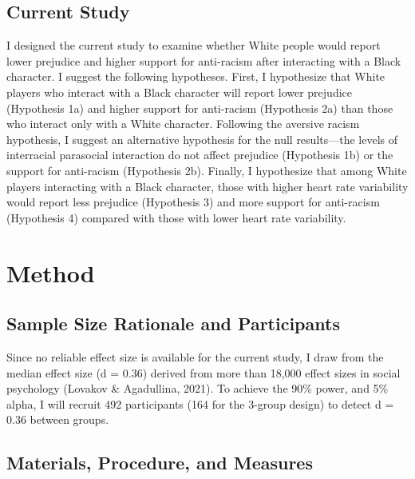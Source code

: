 \documentclass[
  english,
  man, noextraspace,floatsintext]{apa6}
\begin{document}
\hypertarget{current-study}{%
\subsection{Current Study}\label{current-study}}

I designed the current study to examine whether White people would report lower prejudice and higher support for anti-racism after interacting with a Black character. I suggest the following hypotheses. First, I hypothesize that White players who interact with a Black character will report lower prejudice (Hypothesis 1a) and higher support for anti-racism (Hypothesis 2a) than those who interact only with a White character. Following the aversive racism hypothesis, I suggest an alternative hypothesis for the null results---the levels of interracial parasocial interaction do not affect prejudice (Hypothesis 1b) or the support for anti-racism (Hypothesis 2b). Finally, I hypothesize that among White players interacting with a Black character, those with higher heart rate variability would report less prejudice (Hypothesis 3) and more support for anti-racism (Hypothesis 4) compared with those with lower heart rate variability.~

\hypertarget{method}{%
\section{Method}\label{method}}

\hypertarget{sample-size-rationale-and-participants}{%
\subsection{Sample Size Rationale and Participants}\label{sample-size-rationale-and-participants}}

Since no reliable effect size is available for the current study, I draw from the median effect size (d = 0.36) derived from more than 18,000 effect sizes in social psychology (Lovakov \& Agadullina, 2021). To achieve the 90\% power, and 5\% alpha, I will recruit 492 participants (164 for the 3-group design) to detect d = 0.36 between groups.

\hypertarget{materials-procedure-and-measures}{%
\subsection{Materials, Procedure, and Measures}\label{materials-procedure-and-measures}}
\end{document}
